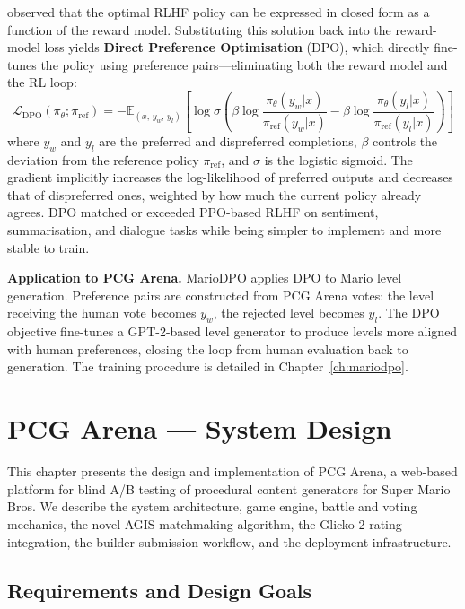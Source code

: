 \documentclass[shortabstract, mgr, english]{iithesis}
\begin{document}
\citet{rafailov2023direct} observed that the optimal RLHF policy can be expressed
in closed form as a function of the reward model. Substituting this solution back
into the reward-model loss yields \textbf{Direct Preference Optimisation} (DPO),
which directly fine-tunes the policy using preference pairs---eliminating both
the reward model and the RL loop:
%
\begin{equation}
\label{eq:dpo}
\mathcal{L}_{\text{DPO}}(\pi_\theta; \pi_{\text{ref}}) =
  -\mathbb{E}_{(x,\,y_w,\,y_l)}\!\left[
    \log\sigma\!\left(
      \beta\log\frac{\pi_\theta(y_w|x)}{\pi_{\text{ref}}(y_w|x)}
      - \beta\log\frac{\pi_\theta(y_l|x)}{\pi_{\text{ref}}(y_l|x)}
    \right)
  \right]
\end{equation}
%
where $y_w$ and $y_l$ are the preferred and dispreferred completions, $\beta$
controls the deviation from the reference policy $\pi_{\text{ref}}$, and
$\sigma$ is the logistic sigmoid. The gradient implicitly increases the
log-likelihood of preferred outputs and decreases that of dispreferred ones,
weighted by how much the current policy already agrees. DPO matched or exceeded
PPO-based RLHF on sentiment, summarisation, and dialogue tasks while being
simpler to implement and more stable to train.

\textbf{Application to PCG Arena.} MarioDPO applies DPO to Mario level
generation. Preference pairs are constructed from PCG Arena votes: the level
receiving the human vote becomes $y_w$, the rejected level becomes $y_l$. The DPO
objective fine-tunes a GPT-2-based level generator to produce levels more aligned
with human preferences, closing the loop from human evaluation back to
generation. The training procedure is detailed in Chapter~\ref{ch:mariodpo}.


\chapter{PCG Arena --- System Design}
\label{ch:system-design}

This chapter presents the design and implementation of PCG Arena, a web-based platform for
blind A/B testing of procedural content generators for Super Mario Bros. We describe the
system architecture, game engine, battle and voting mechanics, the novel AGIS matchmaking
algorithm, the Glicko-2 rating integration, the builder submission workflow, and the
deployment infrastructure.

\section{Requirements and Design Goals}
\label{sec:sd-requirements}
\end{document}
